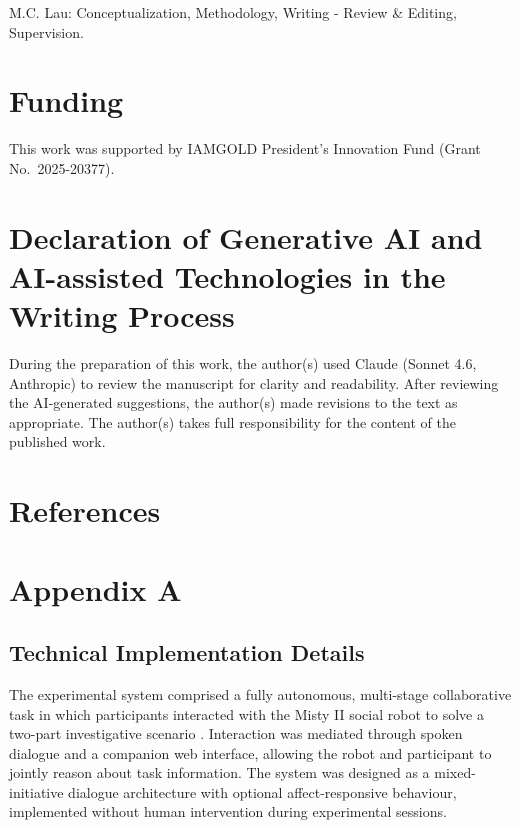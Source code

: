 \documentclass[
]{article}
\newcounter{none} %
\begin{document}
M.C. Lau: Conceptualization, Methodology, Writing - Review \& Editing,
Supervision.

\section{Funding}\label{funding}

This work was supported by IAMGOLD President's Innovation Fund (Grant
No.~2025-20377).

\section{Declaration of Generative AI and AI-assisted Technologies in
the Writing
Process}\label{declaration-of-generative-ai-and-ai-assisted-technologies-in-the-writing-process}

During the preparation of this work, the author(s) used Claude (Sonnet
4.6, Anthropic) to review the manuscript for clarity and readability.
After reviewing the AI-generated suggestions, the author(s) made
revisions to the text as appropriate. The author(s) takes full
responsibility for the content of the published work.

\section{References}\label{refs}

\printbibliography[heading=none]

\section{Appendix A}\label{sec-appendix-a}

\subsection{Technical Implementation
Details}\label{technical-implementation-details}

The experimental system comprised a fully autonomous, multi-stage
collaborative task in which participants interacted with the Misty II
social robot to solve a two-part investigative scenario
\autocite{mistyrobotics}. Interaction was mediated through spoken
dialogue and a companion web interface, allowing the robot and
participant to jointly reason about task information. The system was
designed as a mixed-initiative dialogue architecture with optional
affect-responsive behaviour, implemented without human intervention
during experimental sessions.
\end{document}
